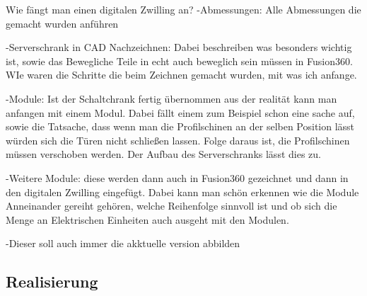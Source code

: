     Wie fängt man einen digitalen Zwilling an?
    -Abmessungen: Alle Abmessungen die gemacht wurden anführen

    -Serverschrank in CAD Nachzeichnen: Dabei beschreiben was besonders wichtig ist, sowie das Bewegliche Teile in echt auch beweglich sein müssen in Fusion360. WIe waren die Schritte die beim Zeichnen gemacht wurden, mit was ich anfange.

    -Module: Ist der Schaltchrank fertig übernommen aus der realität kann man anfangen mit einem Modul. Dabei fällt einem zum Beispiel schon eine sache auf, sowie die Tatsache, dass wenn man die Profilschinen an der selben Position lässt würden sich die Türen nicht schließen lassen. Folge daraus ist, die Profilschinen müssen verschoben werden. Der Aufbau des Serverschranks lässt dies zu.

    -Weitere Module: diese werden dann auch in Fusion360 gezeichnet und dann in den digitalen Zwilling eingefügt. Dabei kann man schön erkennen wie die Module Anneinander gereiht gehören, welche Reihenfolge sinnvoll ist und ob sich die Menge an Elektrischen Einheiten auch ausgeht mit den Modulen. 

    -Dieser soll auch immer die akktuelle version abbilden


\subsection{Realisierung}
\label{sec:Schaltplan}




